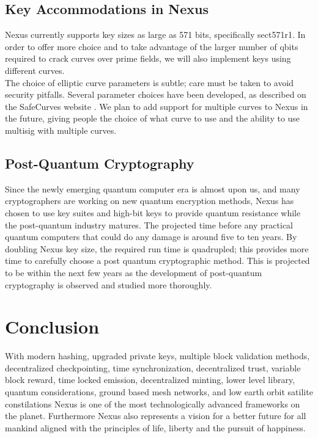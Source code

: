 \documentclass[11pt]{article}
\begin{document}
\subsection{Key Accommodations in Nexus} 

Nexus currently supports key sizes as large as 571 bits, specifically sect571r1.
In order to offer more choice and to take advantage of the larger number of qbits required to crack curves over prime fields, we will also implement keys using different curves.\\

\noindent The choice of elliptic curve parameters is subtle; care must be taken to avoid security pitfalls.
Several parameter choices have been developed, as described on the SafeCurves website \cite{safecurves}.
We plan to add support for multiple curves to Nexus in the future, giving people the choice of what curve to use and the ability to use multisig with multiple curves.

\subsection{Post-Quantum Cryptography}

Since the newly emerging quantum computer era is almost upon us, and many cryptographers are working on new quantum encryption methods, Nexus has chosen to use key suites and high-bit keys to provide quantum resistance while the post-quantum industry matures. 
The projected time before any practical quantum computers that could do any damage is around five to ten years. 
By doubling Nexus key size, the required run time is quadrupled; this provides more time to carefully choose a post quantum cryptographic method. 
This is projected to be within the next few years as the development of post-quantum cryptography is observed and studied more thoroughly.

\section{Conclusion}

With modern hashing, upgraded private keys, multiple block validation methods, decentralized checkpointing, time synchronization, decentralized trust, variable block reward, time locked emission, decentralized minting, lower level library, quantum considerations, ground based mesh networks, and low earth orbit satilite constilations Nexus is one of the most technologically advanced frameworks on the planet. Furthermore Nexus also represents a vision for a better future for all mankind aligned with the principles of life, liberty and the pursuit of happiness.\\ 
\end{document}
